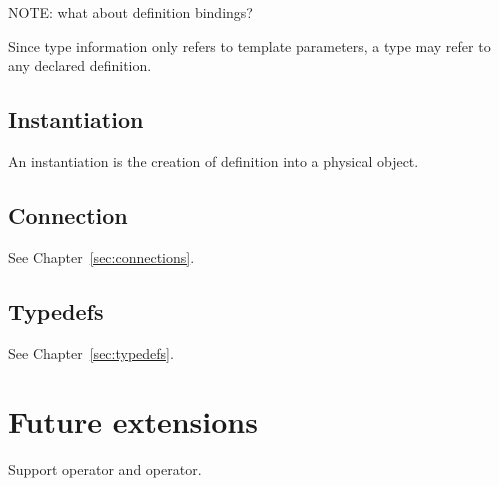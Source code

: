 NOTE: what about definition bindings?

Since type information only refers to template parameters, 
a type may refer to any declared definition.  

\subsection{Instantiation}
\label{sec:types:completeness:instantiation}

An instantiation is the creation of definition into a physical object.  

\subsection{Connection}
\label{sec:types:completeness:connection}

See Chapter~\ref{sec:connections}.  

\subsection{Typedefs}
\label{sec:types:completeness:typedefs}

See Chapter~\ref{sec:typedefs}.  

\section{Future extensions}
\label{sec:types:future}

Support  operator and  operator.  


